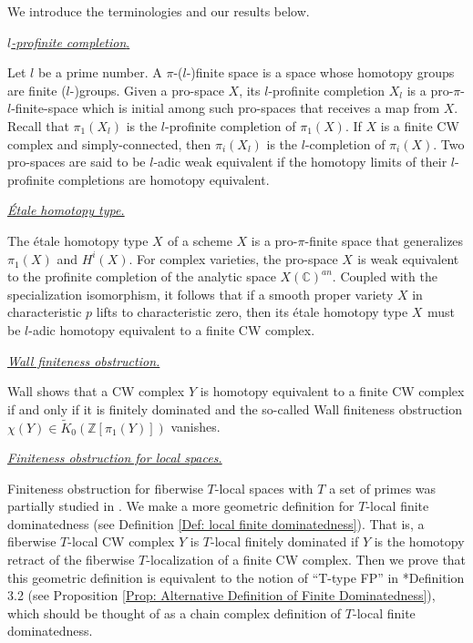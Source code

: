 \documentclass[11pt]{amsart}
\theoremstyle{definition}
\numberwithin{equation}{section}
\numberwithin{equation}{section}
\newcommand\CC{\mathbb{C}}
\newcommand\ZZ{\mathbb{Z}}
\DeclareMathOperator{\et}{\acute{e}t}
\begin{document}
We introduce the terminologies and our results below.

\underline{\textit{$l$-profinite completion}.}

Let $l$ be a prime number. A $\pi$-($l$-)finite space is a space whose homotopy groups are finite ($l$-)groups.
Given a pro-space $X$, its $l$-profinite completion $X_l$ is a pro-$\pi$-$l$-finite-space which is initial among such pro-spaces that receives a map from $X$.
Recall that $\pi_1(X_l)$ is the $l$-profinite completion of $\pi_1(X)$.
If $X$ is a finite CW complex and simply-connected, then  $\pi_i(X_l)$ is the $l$-completion of $\pi_i(X)$. Two pro-spaces are said to be $l$-adic weak equivalent if the homotopy limits of their $l$-profinite completions are homotopy equivalent.

\underline{\textit{\'Etale homotopy type.}}

The étale homotopy type $X_{\et}$ of a scheme $X$ is a pro-$\pi$-finite space that generalizes  $\pi_1^{\et}(X)$ and $H^i_{\et}(X)$.
For complex varieties, the pro-space $X_{\et}$
  is weak equivalent to the profinite completion of the analytic space $X(\CC)^{an}$.
Coupled with the specialization isomorphism, it follows that if a smooth proper variety $X$ in characteristic $p$ lifts to characteristic zero, then its étale homotopy type $X_{\et}$ must be $l$-adic homotopy equivalent to a finite CW complex.

\underline{\textit{Wall finiteness obstruction.}}

Wall \cite{Wall-Finiteness-I,Wall-Finiteness-II} shows that a CW complex $Y$ is homotopy equivalent to a finite CW complex if and only if it is finitely dominated and the so-called Wall finiteness obstruction $\chi(Y)\in \widetilde{K}_0(\ZZ[\pi_1(Y)])$ vanishes. 

\underline{\textit{Finiteness obstruction for local spaces.}}

Finiteness obstruction for fiberwise $T$-local spaces with $T$ a set of primes was partially studied in \cite{local-finiteness}. We make a more geometric definition for $T$-local finite dominatedness (see Definition \ref{Def: local finite dominatedness}). That is, a fiberwise $T$-local CW complex $Y$ is $T$-local finitely dominated if $Y$ is the homotopy retract of the fiberwise $T$-localization of a finite CW complex. Then we prove that this geometric definition is equivalent to the notion of ``T-type FP'' in \cite{local-finiteness}*{Definition 3.2} (see Proposition \ref{Prop: Alternative Definition of Finite Dominatedness}),  which should be thought of as a chain complex definition of $T$-local finite dominatedness. 
\end{document}
